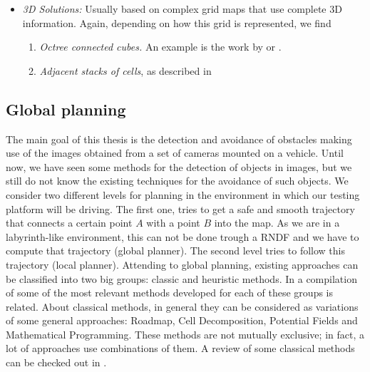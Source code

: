 \begin{itemize}
\begin{enumerate}
  \end{enumerate} 
 \item \emph{3D Solutions:} Usually based on complex grid maps that use complete 3D information. Again, depending on how this grid is represented, we find 
 \begin{enumerate}
   \item \emph{Octree connected cubes.} An example is the work by \cite{wurm2010octomap} or \cite{broggi2013}.
   \item \emph{Adjacent stacks of cells}, as described in \cite{Moravec96robotspatial} 
 \end{enumerate}
\end{itemize}

\subsection{Global planning}\label{ch:chapter00_02_06}

The main goal of this thesis is the detection and avoidance of obstacles making use of the images obtained from a set of cameras mounted on a vehicle. Until now, we have seen some methods for the detection of objects in images, but we still do not know the existing techniques for the avoidance of such objects. We consider two different levels for planning in the environment in which our testing platform will be driving. The first one, tries to get a safe and smooth trajectory that connects a certain point $A$ with a point $B$ into the map. As we are in a labyrinth-like environment, this can not be done trough a \ac{RNDF} and we have to compute that trajectory (global planner). The second level tries to follow this trajectory (local planner).
Attending to global planning, existing approaches can be classified into two big groups: classic and heuristic methods. In \cite{masehian2007classic} a compilation of some of the most relevant methods developed for each of these groups is related.
About classical methods, in general they can be considered as variations of some general approaches: Roadmap, Cell Decomposition, Potential Fields and Mathematical Programming. These methods are not mutually exclusive; in fact, a lot of approaches use combinations of them. A review of some classical methods can be checked out in \cite{hwang1992gross}.
 
